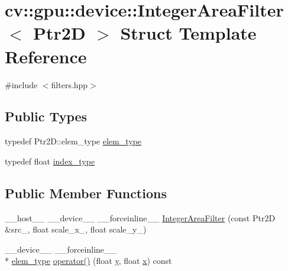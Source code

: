 \hypertarget{structcv_1_1gpu_1_1device_1_1IntegerAreaFilter}{\section{cv\-:\-:gpu\-:\-:device\-:\-:Integer\-Area\-Filter$<$ Ptr2\-D $>$ Struct Template Reference}
\label{structcv_1_1gpu_1_1device_1_1IntegerAreaFilter}
}


{\ttfamily \#include $<$filters.\-hpp$>$}

\subsection*{Public Types}
\begin{DoxyCompactItemize}
\item 
typedef Ptr2\-D\-::elem\-\_\-type \hyperlink{structcv_1_1gpu_1_1device_1_1IntegerAreaFilter_a7ffe790b71c31c44a851412e756f0a39}{elem\-\_\-type}
\item 
typedef float \hyperlink{structcv_1_1gpu_1_1device_1_1IntegerAreaFilter_ae5012b8b53db14ff0903d877969e9a73}{index\-\_\-type}
\end{DoxyCompactItemize}
\subsection*{Public Member Functions}
\begin{DoxyCompactItemize}
\item 
\-\_\-\-\_\-host\-\_\-\-\_\- \-\_\-\-\_\-device\-\_\-\-\_\- \-\_\-\-\_\-forceinline\-\_\-\-\_\- \hyperlink{structcv_1_1gpu_1_1device_1_1IntegerAreaFilter_a3c275c6311aeb74783c89364ec2b94d6}{Integer\-Area\-Filter} (const Ptr2\-D \&src\-\_\-, float scale\-\_\-x\-\_\-, float scale\-\_\-y\-\_\-)
\item 
\-\_\-\-\_\-device\-\_\-\-\_\- \-\_\-\-\_\-forceinline\-\_\-\-\_\- \\*
\hyperlink{structcv_1_1gpu_1_1device_1_1IntegerAreaFilter_a7ffe790b71c31c44a851412e756f0a39}{elem\-\_\-type} \hyperlink{structcv_1_1gpu_1_1device_1_1IntegerAreaFilter_a848fb912075831fb101fbb6eb058c9db}{operator()} (float \hyperlink{highgui__c_8h_af1202c02b14870c18fb3a1da73e9e7c7}{y}, float \hyperlink{highgui__c_8h_a6150e0515f7202e2fb518f7206ed97dc}{x}) const 
\end{DoxyCompactItemize}
